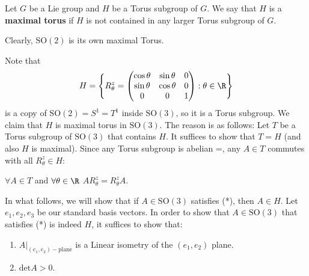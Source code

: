 \begin{definition}
   Let \( G  \) be a Lie group and \( H  \) be a Torus subgroup of \( G  \). We say that \( H  \) is a \textbf{maximal torus} if \( H  \) is not contained in any larger Torus subgroup of \( G  \).  
\end{definition}

\begin{eg}[\( \text{SO}(2) = \text{U}(1) = S^1 \)]
   Clearly, \( \text{SO}(2) \) is its own maximal Torus. 
\end{eg}

\begin{eg}[\( \text{SO}(3) \)]
    Note that 
    \[  H = \Bigg\{ {R}_{\theta}^{z} = \begin{pmatrix} \cos \theta & \sin \theta & 0 \\ \sin \theta & \cos \theta & 0 \\ 0 & 0 & 1  \end{pmatrix} : \theta \in \R   \Bigg\}  \]
    is a copy of \( \text{SO}(2) = S^{1} = T^{1} \) inside \( \text{SO}(3) \), so it is a Torus subgroup. We claim that \( H  \) is maximal torus in \( \text{SO}(3) \). The reason is as follows:
    Let \( T  \) be a Torus subgroup of \( \text{SO}(3) \) that contains \( H  \). It suffices to show that \( T = H  \) (and also \( H  \) is maximal). Since any Torus subgroup is abelian =, any \( A \in T  \) commutes with all \( {R}_{\theta}^{z} \in H  \):
    \begin{center}
        \( \forall A \in T  \) and \( \forall \theta \in \R  \) \hspace{5mm} \( A {R}_{\theta}^{z} = {R}_{\theta}^{z} A  \). 
    \end{center}
    In what follows, we will show that if \( A \in \text{SO}(3) \) satisfies (*), then \( A \in H  \). Let \( {e}_{1}, {e}_{2}, {e}_{3} \) be our standard basis vectors. In order to show that \( A \in \text{SO}(3) \) that satisfies (*) is indeed \( H  \), it suffices to show that: 
    \begin{enumerate}
        \item[(1)] \( A |_{({e}_{1}, {e}_{2})-\text{plane}}  \) is a Linear isometry of the \( ({e}_{1}, {e}_{2})  \) plane.
        \item[(2)] \( \text{det} A > 0   \).
    \end{enumerate}
\end{eg} 
